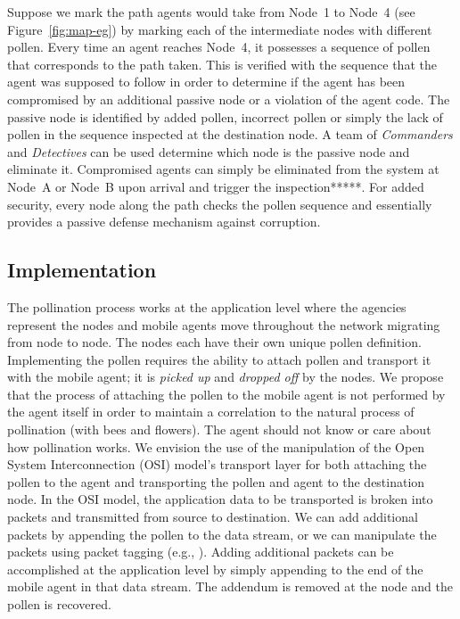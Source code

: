 \documentclass{acm_proc_article-sp}
\begin{document}
Suppose we mark the path agents would take from Node~1 to Node~4 (see Figure~\ref{fig:map-eg}) by marking each of the intermediate nodes with different pollen.  Every time an agent reaches Node~4, it possesses a sequence of pollen that corresponds to the path taken.  This is verified with the sequence that the agent was supposed to follow in order to determine if the agent has been compromised by an additional passive node or a violation of the agent code.  The passive node is identified by added pollen, incorrect pollen or simply the lack of pollen in the sequence inspected at the destination node.  A team of {\it Commanders} and {\it Detectives} can be used determine which node is the passive node and eliminate it.  Compromised agents can simply be eliminated from the system at Node~A or Node~B upon arrival and trigger the inspection*****.  For added security, every node along the path checks the pollen sequence and essentially provides a passive defense mechanism against corruption.

\subsection{Implementation}
The pollination process works at the application level where the agencies represent the nodes and mobile agents move throughout the network migrating from node to node.  The nodes each have their own unique pollen definition.  Implementing the pollen requires the ability to attach pollen and transport it with the mobile agent; it is {\it picked up} and {\it dropped off} by the nodes.  We propose that the process of attaching the pollen to the mobile agent is not performed by the agent itself in order to maintain a correlation to the natural process of pollination (with bees and flowers).  The agent should not know or care about how pollination works.  We envision the use of the manipulation of the Open System Interconnection (OSI) model's transport layer \cite{} for both attaching the pollen to the agent and transporting the pollen and agent to the destination node.  In the OSI model, the application data to be transported is broken into packets and transmitted from source to destination.  We can add additional packets by appending the pollen to the data stream, or we can manipulate the packets using packet tagging (e.g., \cite{belenky03, djemaiel07}).  Adding additional packets can be accomplished at the application level by simply appending to the end of the mobile agent in that data stream.  The addendum is removed at the node and the pollen is recovered.
\end{document}
